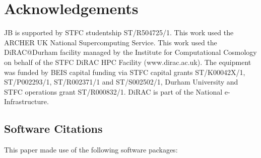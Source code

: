\section{Acknowledgements}
\label{sec:acknowledgements}

JB is supported by STFC studentship ST/R504725/1. This work used the ARCHER
UK National Supercomputing Service.
This work used the DiRAC@Durham facility managed by the Institute for
Computational Cosmology on behalf of the STFC DiRAC HPC Facility
(www.dirac.ac.uk). The equipment was funded by BEIS capital funding
via STFC capital grants ST/K00042X/1, ST/P002293/1, ST/R002371/1 and
ST/S002502/1, Durham University and STFC operations grant
ST/R000832/1. DiRAC is part of the National e-Infrastructure.

\subsection{Software Citations}

This paper made use of the following software packages:


